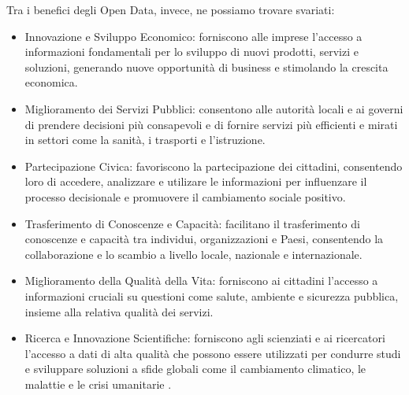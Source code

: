 Tra i benefici degli Open Data, invece, ne possiamo trovare svariati:
\begin{itemize}
    \item Innovazione e Sviluppo Economico: forniscono alle imprese l'accesso a informazioni fondamentali per lo sviluppo di nuovi prodotti, servizi e soluzioni, generando nuove opportunità di business e stimolando la crescita economica.
    \item Miglioramento dei Servizi Pubblici: consentono alle autorità locali e ai governi di prendere decisioni più consapevoli e di fornire servizi più efficienti e mirati in settori come la sanità, i trasporti e l'istruzione.
    \item Partecipazione Civica: favoriscono la partecipazione dei cittadini, consentendo loro di accedere, analizzare e utilizare le informazioni per influenzare il processo decisionale e promuovere il cambiamento sociale positivo.
    \item Trasferimento di Conoscenze e Capacità: facilitano il trasferimento di conoscenze e capacità tra individui, organizzazioni e Paesi, consentendo la collaborazione e lo scambio a livello locale, nazionale e internazionale.
    \item Miglioramento della Qualità della Vita: forniscono ai cittadini l'accesso a informazioni cruciali su questioni come salute, ambiente e sicurezza pubblica, insieme alla relativa qualità dei servizi.
    \item Ricerca e Innovazione Scientifiche: forniscono agli scienziati e ai ricercatori l'accesso a dati di alta qualità che possono essere utilizzati per condurre studi e sviluppare soluzioni a sfide globali come il cambiamento climatico, le malattie e le crisi umanitarie \cite{Open_Data_Opportunità}.
\end{itemize}




